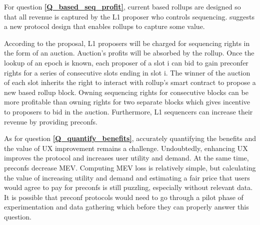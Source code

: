 \documentclass[a4paper]{article}
\theoremstyle{boldstyle}
\begin{document}
    For question \textbf{\ref{Q_based_seq_profit}}, current based rollups are designed so that all revenue is captured by the L1 proposer who controls sequencing. \cite{W:Value-CapturingBasedRollupswithBasedPreconfirmations} suggests a new protocol design that enables rollups to capture some value.

    According to the proposal, L1 proposers will be charged for sequencing rights in the form of an auction. Auction's profits will be absorbed by the rollup. Once the lookup of an epoch is known, each proposer of a slot i can bid to gain preconfer rights for a series of consecutive slots ending in slot i. The winner of the auction of each slot inherits the right to interact with rollup's smart contract to propose a new based rollup block. Owning sequencing rights for consecutive blocks can be more profitable than owning rights for two separate blocks which gives incentive to proposers to bid in the auction. Furthermore, L1 sequencers can increase their revenue by providing preconfs.

    As for question \textbf{\ref{Q_quantify_benefits}}, accurately quantifying the benefits and the value of UX improvement remains a challenge. Undoubtedly, enhancing UX improves the protocol and increases user utility and demand. At the same time, preconfs decrease MEV. Computing MEV loss is relatively simple, but calculating the value of increasing utility and demand and estimating a fair price that users would agree to pay for preconfs is still puzzling, especially without relevant data. It is possible that preconf protocols would need to go through a pilot phase of experimentation and data gathering which before they can properly answer this question.
\end{document}
